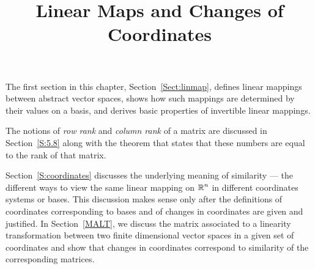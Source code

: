 \documentclass{ximera}
\title{Linear Maps and Changes of Coordinates}
\begin{document}
\begin{abstract}
\end{abstract}
\maketitle


\label{C:LMCC}

\normalsize

The first section in this chapter, Section~\ref{Sect:linmap}, defines linear 
mappings between abstract vector spaces, shows how such mappings are
determined by their values on a basis, and derives basic properties of 
invertible linear mappings. 
  
The notions of {\em row rank\/} and {\em column rank\/} of a matrix are
discussed in Section~\ref{S:5.8} along with the theorem that states that
these numbers are equal to the rank of that matrix.

Section~\ref{S:coordinates} discusses the underlying meaning of similarity 
--- the different ways to view the same linear mapping on $\mbox{$\Bbb{R}$}^n$ in different 
coordinates systems or bases.  This discussion makes sense only after the 
definitions of coordinates corresponding to bases and of changes in 
coordinates are given and justified.  In Section~\ref{MALT}, we discuss the 
matrix associated to a linearity transformation between two finite
dimensional vector spaces in a given set of coordinates and show that changes 
in coordinates correspond to similarity of the corresponding matrices.
\end{document}
